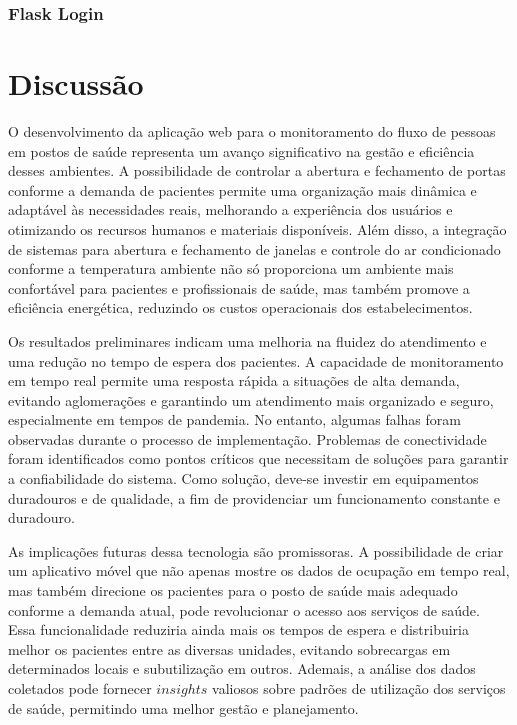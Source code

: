 \documentclass[conference, a4paper, 12pt]{IEEEtran}
\begin{document}
\subsubsection{Flask Login}

\section{Discussão}
\label{sec:discussion}
  O desenvolvimento da aplicação web para o monitoramento do fluxo de pessoas em postos de saúde representa um avanço significativo na gestão e eficiência desses ambientes. A possibilidade de controlar a abertura e fechamento de portas conforme a demanda de pacientes permite uma organização mais dinâmica e adaptável às necessidades reais, melhorando a experiência dos usuários e otimizando os recursos humanos e materiais disponíveis. Além disso, a integração de sistemas para abertura e fechamento de janelas e controle do ar condicionado conforme a temperatura ambiente não só proporciona um ambiente mais confortável para pacientes e profissionais de saúde, mas também promove a eficiência energética, reduzindo os custos operacionais dos estabelecimentos.

  Os resultados preliminares indicam uma melhoria na fluidez do atendimento e uma redução no tempo de espera dos pacientes. A capacidade de monitoramento em tempo real permite uma resposta rápida a situações de alta demanda, evitando aglomerações e garantindo um atendimento mais organizado e seguro, especialmente em tempos de pandemia. No entanto, algumas falhas foram observadas durante o processo de implementação. Problemas de conectividade foram identificados como pontos críticos que necessitam de soluções para garantir a confiabilidade do sistema. Como solução, deve-se investir em equipamentos duradouros e de qualidade, a fim de providenciar um funcionamento constante e duradouro. 

  As implicações futuras dessa tecnologia são promissoras. A possibilidade de criar um aplicativo móvel que não apenas mostre os dados de ocupação em tempo real, mas também direcione os pacientes para o posto de saúde mais adequado conforme a demanda atual, pode revolucionar o acesso aos serviços de saúde. Essa funcionalidade reduziria ainda mais os tempos de espera e distribuiria melhor os pacientes entre as diversas unidades, evitando sobrecargas em determinados locais e subutilização em outros. Ademais, a análise dos dados coletados pode fornecer $insights$ valiosos sobre padrões de utilização dos serviços de saúde, permitindo uma melhor gestão e planejamento. 
\end{document}
